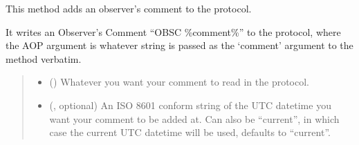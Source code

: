 \documentclass[letterpaper,10pt,english]{sphinxmanual}
\begin{document}
\begin{fulllineitems}
\begin{fulllineitems}
\begin{quote}
\begin{description}
\end{description}\end{quote}

\end{fulllineitems}


\begin{fulllineitems}
\label{\detokenize{autoapi/aop/aop/index:aop.aop.Session.comment}}
\pysigstartsignatures
{}
\pysigstopsignatures
\sphinxAtStartPar
This method adds an observer’s comment to the protocol.

\sphinxAtStartPar
It writes an Observer’s Comment “OBSC \%comment\%” to the protocol, where
the AOP argument is whatever string is passed as the ‘comment’ argument
to the method verbatim.
\begin{quote}\begin{description}
\begin{itemize}
\item {} 
\sphinxAtStartPar
{} () \textendash{} Whatever you want your comment to read in the protocol.

\item {} 
\sphinxAtStartPar
{} (, optional) \textendash{} An ISO 8601 conform string of the UTC datetime you want your
comment to be added at. Can also be “current”, in which case the
current UTC datetime will be used, defaults to “current”.

\end{itemize}

\end{description}\end{quote}

\end{fulllineitems}



\end{fulllineitems}
\end{document}
